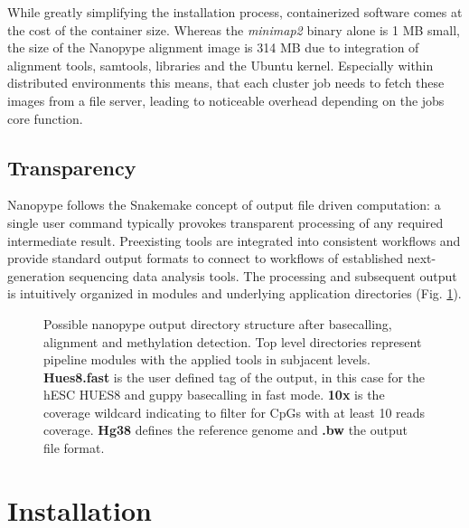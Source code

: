 While greatly simplifying the installation process, containerized software comes at the cost of the container size. Whereas the \textit{minimap2} binary alone is 1 MB small, the size of the Nanopype alignment image is 314 MB due to integration of alignment tools, samtools, libraries and the Ubuntu kernel. Especially within distributed environments this means, that each cluster job needs to fetch these images from a file server, leading to noticeable overhead depending on the jobs core function. 


\subsection{Transparency}
\label{subsec:nanopype:transparency}
Nanopype follows the Snakemake concept of output file driven computation: a single user command typically provokes transparent processing of any required intermediate result. Preexisting tools are integrated into consistent workflows and provide standard output formats to connect to workflows of established next-generation sequencing data analysis tools. The processing and subsequent output is intuitively organized in modules and underlying application directories (Fig. \ref{fig:nanopype:dir_tree}).

\begin{figure}[h]
	\centering
	\begin{minipage}{.7\linewidth}
	\end{minipage}
	\captionsetup{format=plain}
	\caption[Possible nanopype output directory]{Possible nanopype output directory structure after basecalling, alignment and methylation detection. Top level directories represent pipeline modules with the applied tools in subjacent levels. \textbf{Hues8.fast} is the user defined tag of the output, in this case for the hESC HUES8 and guppy basecalling in fast mode. \textbf{10x} is the coverage wildcard indicating to filter for CpGs with at least 10 reads coverage. \textbf{Hg38} defines the reference genome and \textbf{.bw} the output file format.}
	\label{fig:nanopype:dir_tree}
\end{figure}




\section{Installation}
\label{sec:nanopype:installation}

